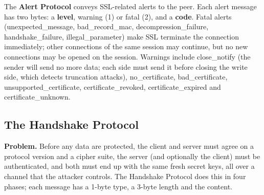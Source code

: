 The \textbf{Alert Protocol} conveys SSL-related alerts to the peer. Each alert message has two bytes: a \textbf{level}, warning (1) or fatal (2), and a \textbf{code}. Fatal alerts (unexpected\_message, bad\_record\_mac, decompression\_failure, handshake\_failure, illegal\_parameter) make SSL terminate the connection immediately; other connections of the same session may continue, but no new connections may be opened on the session. Warnings include close\_notify (the sender will send no more data; each side must send it before closing the write side, which detects truncation attacks), no\_certificate, bad\_certificate, unsupported\_certificate, certificate\_revoked, certificate\_expired and certificate\_unknown.

\subsection{The Handshake Protocol \hot\new}

\textbf{Problem.} Before any data are protected, the client and server must agree on a protocol version and a cipher suite, the server (and optionally the client) must be authenticated, and both must end up with the same fresh secret keys, all over a channel that the attacker controls. The Handshake Protocol does this in four phases; each message has a 1-byte type, a 3-byte length and the content.

